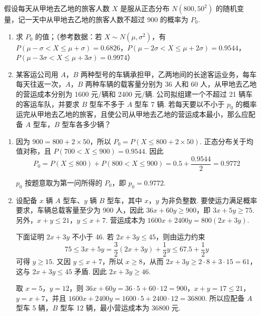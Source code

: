 \begin{problem}
假设每天从甲地去乙地的旅客人数 \(X\) 是服从正态分布 \(N(800,50^{2})\) 的随机变量，记一天中从甲地去乙地的旅客人数不超过 900 的概率为 \(P_{0}\).
\begin{enumerate}
\item 求 \(P_{0}\) 的值；（参考数据：若 \(X \sim N(\mu, \sigma^{2})\)，有 \(P(\mu - \sigma < X \leqslant \mu + \sigma) = 0.6826\)，\(P(\mu - 2\sigma < X \leqslant \mu + 2\sigma) = 0.9544\)，\(P(\mu - 3\sigma < X \leqslant \mu + 3\sigma) = 0.9974\)）
\item 某客运公司用 \(A\)，\(B\) 两种型号的车辆承担甲，乙两地间的长途客运业务，每车每天往返一次，\(A\)，\(B\) 两种车辆的载客量分别为 36 人和 60 人，从甲地去乙地的营运成本分别为 1600 元/辆和 2400 元/辆. 公司拟组建一个不超过 21 辆车的客运车队，并要求 \(B\) 型车不多于 \(A\) 型车 7 辆. 若每天要以不小于 \(p_0\) 的概率运完从甲地去乙地的旅客，且使公司从甲地去乙地的营运成本最小，那么应配备 \(A\) 型车，\(B\) 型车各多少辆？
\end{enumerate}
\end{problem}

\begin{solution}
\begin{enumerate}
\item 因为 \(900=800+2\times50\)，所以 \(P_0=P(X\leqslant800+2\times50)\).
正态分布关于均值对称，且 \(P(700<X\leqslant900)=0.9544\).
因此
\[
P_0=P(X\leqslant800)+P(800<X\leqslant900)
=0.5+\frac{0.9544}{2}=0.9772
\]

\(p_0\) 按题意取为第一问所得的 \(P_0\)，即 \(p_0=0.9772\).

\item 设配备 \(x\) 辆 \(A\) 型车、\(y\) 辆 \(B\) 型车，其中 \(x\)，\(y\) 为非负整数. 要使运力满足概率要求，车辆总载客量至少为 900 人，因此 \(36x+60y\geqslant900\)，即 \(3x+5y\geqslant75\). 另外，\(x+y\leqslant21\)，\(y\leqslant x+7\). 营运成本为 \(1600x+2400y=800(2x+3y)\).

下面证明 \(2x+3y\) 不小于 46. 若 \(2x+3y\leqslant45\)，则由运力约束
\[
75\leqslant3x+5y
=\frac{3}{2}(2x+3y)+\frac{1}{2}y
\leqslant67.5+\frac{1}{2}y
\]
可得 \(y\geqslant15\). 又因 \(y\leqslant x+7\)，所以 \(x\geqslant8\)，从而 \(2x+3y\geqslant2\cdot8+3\cdot15=61\)，这与 \(2x+3y\leqslant45\) 矛盾. 因此 \(2x+3y\geqslant46\).

取 \(x=5\)，\(y=12\)，则 \(36x+60y=36\cdot5+60\cdot12=900\)，\(x+y=17\leqslant21\)，\(y=x+7\)，并且 \(1600x+2400y=1600\cdot5+2400\cdot12=36800\).
所以应配备 \(A\) 型车 5 辆，\(B\) 型车 12 辆，最小营运成本为 36800 元.
\end{enumerate}
\end{solution}

